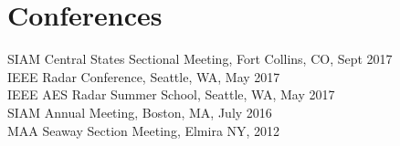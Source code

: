 \documentclass[letterpaper]{pine-resume} %
\begin{document}
\begin{minipage}[t]{0.65\textwidth}
\section{Conferences}

SIAM Central States Sectional Meeting, Fort Collins, CO, Sept 2017 \\
IEEE Radar Conference, Seattle, WA, May 2017 \\
IEEE AES Radar Summer School, Seattle, WA, May 2017 \\
SIAM Annual Meeting, Boston, MA, July 2016 \\
MAA Seaway Section Meeting, Elmira NY, 2012

\sectionspace %






\end{minipage} %
\hfill
\begin{minipage}[t]{0.33\textwidth} %


\end{minipage} %

\end{document}
